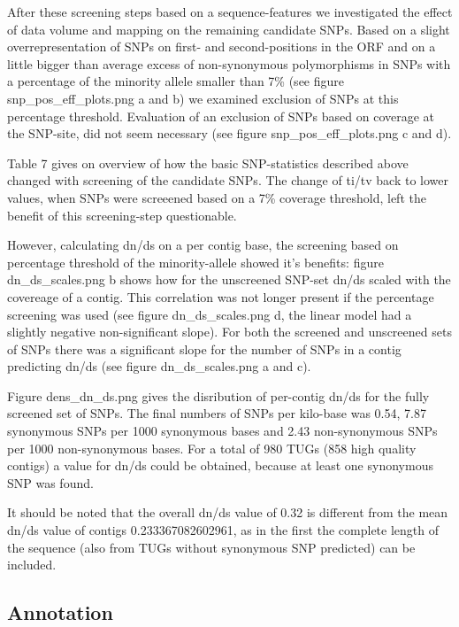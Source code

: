 \documentclass[10pt]{bmc_article}
\newenvironment{bmcformat}{\begin{raggedright}\baselineskip20pt\sloppy\setboolean{publ}{false}}{\end{raggedright}\baselineskip20pt\sloppy}
\begin{document}
\begin{bmcformat}
After these screening steps based on a sequence-features we
investigated the effect of data volume and mapping on the remaining
candidate SNPs. Based on a slight overrepresentation of SNPs on first-
and second-positions in the ORF and on a little bigger than average
excess of non-synonymous polymorphisms in SNPs with a percentage of
the minority allele smaller than 7\% (see figure
snp\_pos\_eff\_plots.png a and b) we examined exclusion of SNPs at
this percentage threshold. Evaluation of an exclusion of SNPs based on
coverage at the SNP-site, did not seem necessary (see figure
snp\_pos\_eff\_plots.png c and d).

Table 7 gives on overview of how the basic SNP-statistics described
above changed with screening of the candidate SNPs. The change of
ti/tv back to lower values, when SNPs were screeened based on a 7\%
coverage threshold, left the benefit of this screening-step
questionable.

However, calculating dn/ds on a per contig base, the screening based
on percentage threshold of the minority-allele showed it's benefits:
figure dn\_ds\_scales.png b shows how for the unscreened SNP-set dn/ds
scaled with the covereage of a contig. This correlation was not longer
present if the percentage screening was used (see figure
dn\_ds\_scales.png d, the linear model had a slightly negative
non-significant slope). For both the screened and unscreened sets of
SNPs there was a significant slope for the number of SNPs in a contig
predicting dn/ds (see figure dn\_ds\_scales.png a and c).

Figure dens\_dn\_ds.png gives the disribution of per-contig dn/ds for
the fully screened set of SNPs. The final numbers of SNPs per
kilo-base was 0.54,
7.87 synonymous SNPs per 1000 synonymous
bases and 2.43 non-synonymous SNPs per
1000 non-synonymous bases. For a total of
980 TUGs
(858 high
  quality contigs) a value for dn/ds could be obtained, because at
  least one synonymous SNP was found.

  It should be noted that the overall dn/ds value of
  0.32 is different from the mean dn/ds value of contigs
  0.233367082602961, as in the first the
  complete length of the sequence (also from TUGs without synonymous
  SNP predicted) can be included.

\subsection*{Annotation}



\end{bmcformat}
\end{document}
